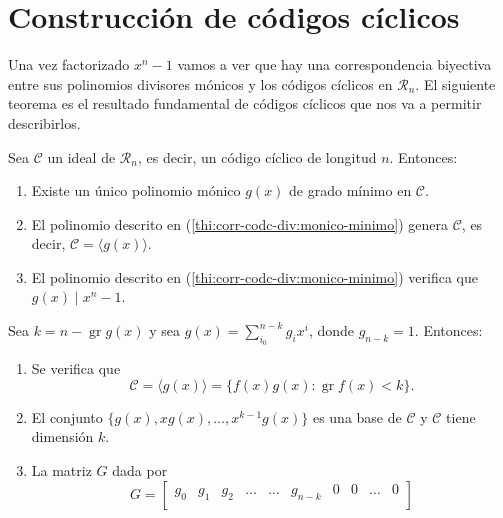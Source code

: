 \section{Construcción de códigos cíclicos}

Una vez factorizado \(x^n - 1\) vamos a ver que hay una correspondencia biyectiva entre sus polinomios divisores mónicos y los códigos cíclicos en \(\mathcal R_n\).
El siguiente teorema es el resultado fundamental de códigos cíclicos que nos va a permitir describirlos.

\begin{theorem}
  \label{th:corr-cod-div}
  Sea \(\mathcal C\) un ideal de \(\mathcal R_n\), es decir, un código cíclico de longitud \(n\). Entonces:
  \begin{enumerate}
    \item Existe un único polinomio mónico \(g(x)\) de grado mínimo en \(\mathcal C\).\label{thi:corr-codc-div:monico-minimo}
    \item El polinomio descrito en (\ref{thi:corr-codc-div:monico-minimo}) genera \(\mathcal C\), es decir, \(\mathcal C = \langle g(x)\rangle\).
    \item El polinomio descrito en (\ref{thi:corr-codc-div:monico-minimo}) verifica que \(g(x) \mid x^n -1\).\label{thi:corr-codc-div:div-xn-1}
  \end{enumerate}
  Sea \(k = n - \operatorname{gr} g(x)\) y sea \(g(x) = \sum_{i_0}^{n-k}g_ix^{i}\), donde \(g_{n-k} = 1\). Entonces:
  \begin{enumerate}[resume]
    \item \label{thi:corr-codc-div:forma-elem} Se verifica que \[
      \mathcal C = \langle g(x) \rangle = \{f(x)g(x) : \operatorname{gr} f(x) < k\}.
    \]
    \item \label{thi:corr-codc-div:dim-ideal} El conjunto \(\{g(x), xg(x), \dots, x^{k-1}g(x)\}\) es una base de \(\mathcal C\) y \(\mathcal C\) tiene dimensión \(k\).
    \item \label{thi:corr-cod-div:mat-gen} La matriz \(G\) dada por \[
      G = \begin{bmatrix}
        g_0 & g_1 & g_2 & \dots & \dots & g_{n-k} & 0 & 0 & \dots & 0 \\

\end{bmatrix}\]
\end{enumerate}
\end{theorem}
